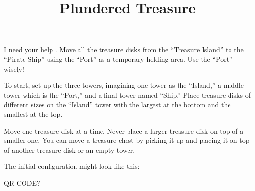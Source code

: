 \documentclass{../exhibit}
\title{Plundered Treasure}
\begin{document}
\begin{context} I need your help .  Move all the treasure disks from
the ``Treasure Island'' to the ``Pirate Ship'' using the ``Port'' as a
temporary holding area.  Use the ``Port'' wisely!
\end{context}

\begin{directions} To start, set up the three towers, imagining one
tower as the ``Island,'' a middle tower which is the
``Port,'' and a final tower named ``Ship.''  Place 
treasure disks of different sizes on the ``Island'' tower
with the largest at the bottom and the smallest at the top.

Move one treasure disk at a time.  Never place
a larger treasure disk on top of a smaller one.
You can move a treasure chest by picking it up and placing it on top
of another treasure disk or an empty tower.
\end{directions}


\begin{example}
  The initial configuration might look like this:
\begin{center}
\end{center}
\end{example}


\begin{mathConnections}
  QR CODE?
\end{mathConnections}
\end{document}
